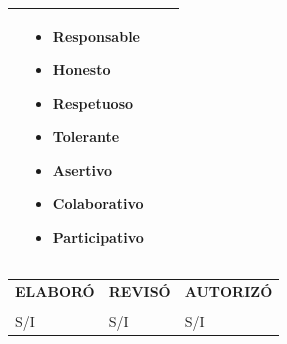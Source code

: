 \documentclass[10pt]{article}
\begin{document}
\begin{enumerate}
\begin{tabular}{|p{}|p{}|p{}|p{}|}
\begin{itemize}[leftmargin=*]
      \end{itemize}
      & 
      \begin{itemize}[leftmargin=*]
      \setlength{\itemsep}{0pt}
      \setlength{\parskip}{0pt}
      \item Responsable\item Honesto\item Respetuoso\item Tolerante\item Asertivo\item Colaborativo\item Participativo
      \end{itemize}
      \\\hline
    \end{tabular}
\end{enumerate}

  \begin{tabular}{p{}p{}p{}}

      \centering
      \textbf{ELABORÓ} 
      &
      \centering
      \textbf{REVISÓ} 
      &
      \centering
      \textbf{AUTORIZÓ}\\
      &&&\\

      \centering
      \hline 
      S/I
      &
      \centering
      \hline 
      S/I
      &
      \centering
      \hline 
       S/I
  \end{tabular}
\end{document}

